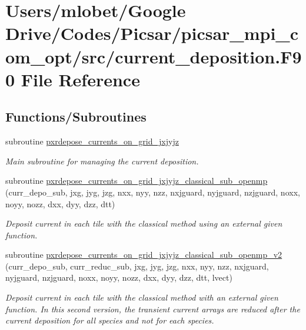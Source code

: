 \hypertarget{current__deposition_8_f90}{}\section{Users/mlobet/\+Google Drive/\+Codes/\+Picsar/picsar\+\_\+mpi\+\_\+com\+\_\+opt/src/current\+\_\+deposition.F90 File Reference}
\label{current__deposition_8_f90}
\subsection*{Functions/\+Subroutines}
\begin{DoxyCompactItemize}
\item 
subroutine \hyperlink{current__deposition_8_f90_af9162fd522e5d0fe559fc65848991ee3}{pxrdepose\+\_\+currents\+\_\+on\+\_\+grid\+\_\+jxjyjz}
\begin{DoxyCompactList}\small\item\em Main subroutine for managing the current deposition. \end{DoxyCompactList}\item 
subroutine \hyperlink{current__deposition_8_f90_a080efb61c81857c980b0bee1ec2473e9}{pxrdepose\+\_\+currents\+\_\+on\+\_\+grid\+\_\+jxjyjz\+\_\+classical\+\_\+sub\+\_\+openmp} (curr\+\_\+depo\+\_\+sub, jxg, jyg, jzg, nxx, nyy, nzz, nxjguard, nyjguard, nzjguard,   noxx, noyy, nozz, dxx, dyy, dzz, dtt)
\begin{DoxyCompactList}\small\item\em Deposit current in each tile with the classical method using an external given function. \end{DoxyCompactList}\item 
subroutine \hyperlink{current__deposition_8_f90_a2624df4633b361373555666b08c92ca1}{pxrdepose\+\_\+currents\+\_\+on\+\_\+grid\+\_\+jxjyjz\+\_\+classical\+\_\+sub\+\_\+openmp\+\_\+v2} (curr\+\_\+depo\+\_\+sub, curr\+\_\+reduc\+\_\+sub, jxg, jyg, jzg, nxx, nyy, nzz, nxjguard, nyjguard, nzjguard, noxx, noyy, nozz, dxx, dyy, dzz, dtt, lvect)
\begin{DoxyCompactList}\small\item\em Deposit current in each tile with the classical method with an external given function. In this second version, the transient current arrays are reduced after the current deposition for all species and not for each species. \end{DoxyCompactList}\item 

\end{DoxyCompactItemize}
